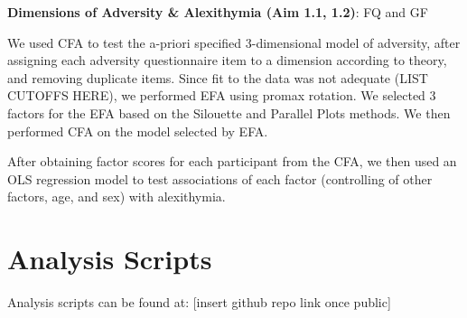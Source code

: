 \documentclass[
]{book}
\begin{document}
\textbf{Dimensions of Adversity \& Alexithymia (Aim 1.1, 1.2)}: FQ and GF

We used CFA to test the a-priori specified 3-dimensional model of adversity, after assigning each adversity questionnaire item to a dimension according to theory, and removing duplicate items. Since fit to the data was not adequate (LIST CUTOFFS HERE), we performed EFA using promax rotation. We selected 3 factors for the EFA based on the Silouette and Parallel Plots methods. We then performed CFA on the model selected by EFA.

After obtaining factor scores for each participant from the CFA, we then used an OLS regression model to test associations of each factor (controlling of other factors, age, and sex) with alexithymia.

\hypertarget{analysis-scripts}{%
\section{Analysis Scripts}\label{analysis-scripts}}

Analysis scripts can be found at: {[}insert github repo link once public{]}

  
\end{document}
